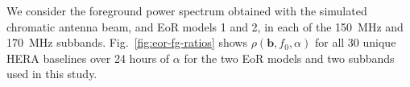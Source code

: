 \documentclass[preprint2,iop,numberedappendix,twocolappendix,appendixfloats]{emulateapj}
\begin{document}
We consider the foreground power spectrum obtained with the simulated chromatic antenna beam, and EoR models 1 and 2, in each of the 150~MHz and 170~MHz subbands. Fig.~\ref{fig:eor-fg-ratios} shows $\rho(\boldsymbol{b},f_0,\alpha)$ for all 30 unique HERA baselines over 24 hours of $\alpha$ for the two EoR models and two subbands used in this study. 

\begin{figure}[htb]
  \centering
   \\

\end{figure}
\end{document}
